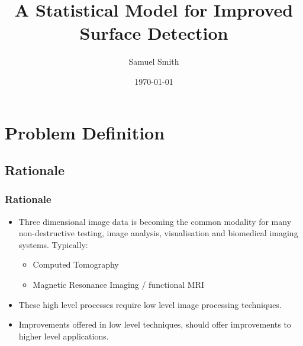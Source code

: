 \documentclass[9pt]{beamer}
\title[Statistical Model for Improved Surface Detection]{A Statistical Model for Improved Surface Detection} %
\author{Samuel Smith} %
\institute[Birmingham City University] %
{
Birmingham City University \\ %
\medskip
\textit{samuel.smith@mail.bcu.ac.uk} %
}
\date{\today} %
\begin{document}
\begin{frame}
	\titlepage %
\end{frame}
\section{Problem Definition}
\subsection{Rationale}
\begin{frame}
	\frametitle{Rationale}
		\begin{itemize}
			\item Three dimensional image data is becoming the common modality for many non-destructive testing, image analysis, visualisation and biomedical imaging systems. Typically:
			\begin{itemize}
				\item Computed Tomography
				\item Magnetic Resonance Imaging / functional MRI
			\end{itemize}
				\item These high level processes require low level image processing techniques.
				\item Improvements offered in low level techniques, should offer improvements to higher level applications.
		\end{itemize}
\end{frame}
\end{document}
